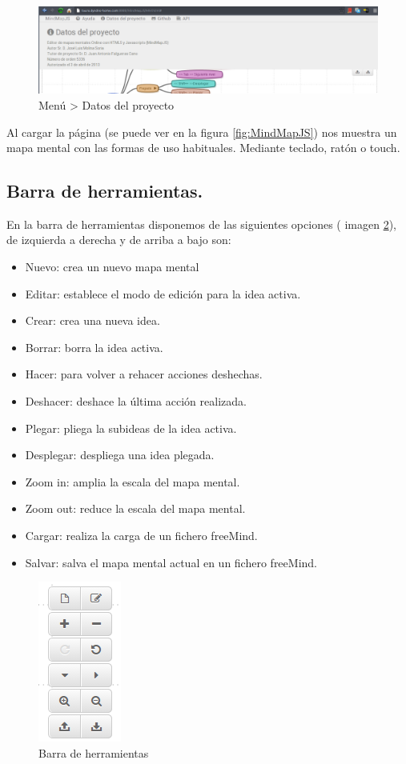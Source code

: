 \begin{figure}[tbph]
\centering
\includegraphics[width=\linewidth]{imagenes/MindMapJS2}
\caption{Menú > Datos del proyecto}
\label{fig:Menu-datos-del-proyecto}
\end{figure}

Al cargar la página (se puede ver en la figura \ref{fig:MindMapJS}) nos muestra un mapa mental con las formas de uso habituales. Mediante teclado, ratón o touch.

\subsection{Barra de herramientas.}

En la barra de herramientas disponemos de las siguientes opciones ( imagen \ref{fig:barra-herrramientas}), de izquierda a derecha y de arriba a bajo son:
\begin{itemize}
\item Nuevo: crea un nuevo mapa mental
\item Editar: establece el modo de edición para la idea activa.
\item Crear: crea una nueva idea.
\item Borrar: borra la idea activa.
\item Hacer: para volver a rehacer acciones deshechas. 
\item Deshacer: deshace la última acción realizada.
\item Plegar: pliega la subideas de la idea activa.
\item Desplegar: despliega una idea plegada.
\item Zoom in: amplia la escala del mapa mental.
\item Zoom out: reduce la escala del mapa mental.
\item Cargar: realiza la carga de un fichero freeMind.
\item Salvar: salva el mapa mental actual en un fichero freeMind.
\end{itemize}

\begin{figure}[tbph]
\centering
\includegraphics[width=0.1\linewidth]{imagenes/barraHerramientas}
\caption{Barra de herramientas}
\label{fig:barra-herrramientas}
\end{figure}


